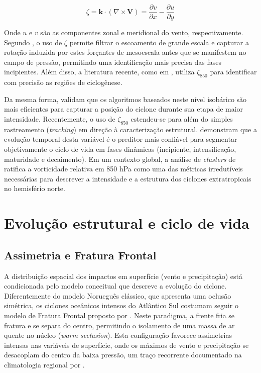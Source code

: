 \begin{equation}
    \zeta = \mathbf{k} \cdot (\nabla \times \mathbf{V}) = \frac{\partial v}{\partial x} - \frac{\partial u}{\partial y}
\end{equation}

Onde $u$ e $v$ são as componentes zonal e meridional do vento, respectivamente. Segundo \citet{hoskins2005new}, o uso de $\zeta$ permite filtrar o escoamento de grande escala e capturar a rotação induzida por estes forçantes de mesoescala antes que se manifestem no campo de pressão, permitindo uma identificação mais precisa das fases incipientes. Além disso, a literatura recente, como em \citet{gramcianinov2019properties}, utiliza $\zeta_{850}$ para identificar com precisão as regiões de ciclogênese.

Da mesma forma, \citet{padilhareinke2024objective} validam que os algoritmos baseados neste nível isobárico são mais eficientes para capturar a posição do ciclone durante sua etapa de maior intensidade. Recentemente, o uso de $\zeta_{850}$ estendeu-se para além do simples rastreamento (\textit{tracking}) em direção à caracterização estrutural. \citet{coutodesouza2024new} demonstram que a evolução temporal desta variável é o preditor mais confiável para segmentar objetivamente o ciclo de vida em fases dinâmicas (incipiente, intensificação, maturidade e decaimento). Em um contexto global, a análise de \textit{clusters} de \citet{corner2025classification} ratifica a vorticidade relativa em 850 hPa como uma das métricas irredutíveis necessárias para descrever a intensidade e a estrutura dos ciclones extratropicais no hemisfério norte.


\section{Evolução estrutural e ciclo de vida}\label{sec:mt_evolucion}

\subsection{Assimetria e Fratura Frontal}\label{subsec:mt_modelos}
A distribuição espacial dos impactos em superfície (vento e precipitação) está condicionada pelo modelo conceitual que descreve a evolução do ciclone. Diferentemente do modelo Norueguês clássico, que apresenta uma oclusão simétrica, os ciclones oceânicos intensos do Atlântico Sul costumam seguir o modelo de Fratura Frontal proposto por \citet{shapiro1990life}. Neste paradigma, a frente fria se fratura e se separa do centro, permitindo o isolamento de uma massa de ar quente no núcleo (\textit{warm seclusion}). Esta configuração favorece assimetrias intensas nas variáveis de superfície, onde os máximos de vento e precipitação se desacoplam do centro da baixa pressão, um traço recorrente documentado na climatologia regional por \citet{reboita2010south}.

